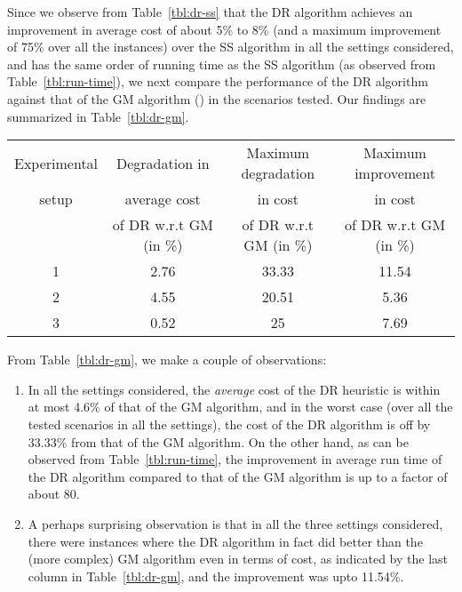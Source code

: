 \documentclass[conference]{IEEEtran}
\begin{document}
Since we observe from Table~\ref{tbl:dr-ss} that the DR algorithm achieves an improvement in average cost of about 5\% to 8\% (and a maximum improvement of 75\% over all the instances) over the SS algorithm in all the settings considered, and has the same order of running time as the SS algorithm (as observed from Table~\ref{tbl:run-time}), we next compare the performance of the DR algorithm against that of the GM algorithm (\cite{sitanayah}) in the scenarios tested. Our findings are summarized in Table~\ref{tbl:dr-gm}.

\begin{table*}[t]
  \centering
\caption{Performance Comparison of the DR and GM Algorithms}
\label{tbl:dr-gm}
\scriptsize
  \begin{tabular}{|c|c|c|c|}\hline
    Experimental & Degradation in & Maximum degradation & Maximum improvement\\
      setup      &  average cost  &    in cost          &  in cost            \\
                 & of DR w.r.t GM (in \%)&   of DR w.r.t GM (in \%)   &  of DR w.r.t GM (in \%)     \\
    \hline
      1 & 2.76 & 33.33 & 11.54\\
      2 & 4.55 & 20.51 & 5.36\\
      3 & 0.52 & 25    & 7.69\\ 
  \hline
\end{tabular}
\normalsize
\end{table*} 

From Table~\ref{tbl:dr-gm}, we make a couple of observations:

\begin{enumerate}
\item In all the settings considered, the \emph{average} cost of the DR heuristic is within at most 4.6\% of that of the GM algorithm, and in the worst case (over all the tested scenarios in all the settings), the cost of the DR algorithm is off by 33.33\% from that of the GM algorithm. On the other hand, as can be observed from Table~\ref{tbl:run-time}, the improvement in average run time of the DR algorithm compared to that of the GM algorithm is up to a factor of about 80. 
\item A perhaps surprising observation is that in all the three settings considered, there were instances where the DR algorithm in fact did better than the (more complex) GM algorithm even in terms of cost, as indicated by the last column in Table~\ref{tbl:dr-gm}, and the improvement was upto 11.54\%. 
\end{enumerate}
\end{document}
